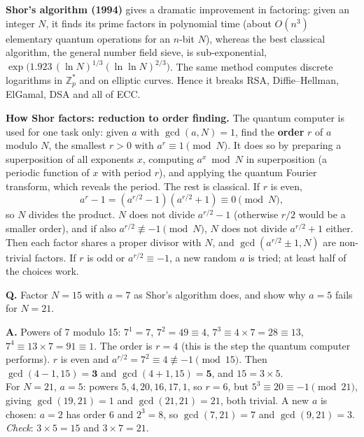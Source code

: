 \textbf{Shor's algorithm (1994)} gives a dramatic improvement in factoring: given an integer $N$, it finds its prime factors in polynomial time (about $O(n^3)$ elementary quantum operations for an $n$-bit $N$), whereas the best classical algorithm, the general number field sieve, is sub-exponential, $\exp\!\big(1.923\,(\ln N)^{1/3}(\ln\ln N)^{2/3}\big)$. The same method computes discrete logarithms in $\mathbb{Z}_p^*$ and on elliptic curves. Hence it breaks RSA, Diffie--Hellman, ElGamal, DSA and all of ECC.

\textbf{How Shor factors: reduction to order finding.} The quantum computer is used for one task only: given $a$ with $\gcd(a, N) = 1$, find the \textbf{order} $r$ of $a$ modulo $N$, the smallest $r > 0$ with $a^r \equiv 1 \pmod N$. It does so by preparing a superposition of all exponents $x$, computing $a^x \bmod N$ in superposition (a periodic function of $x$ with period $r$), and applying the quantum Fourier transform, which reveals the period. The rest is classical. If $r$ is even,
\[
a^r - 1 = (a^{r/2} - 1)(a^{r/2} + 1) \equiv 0 \pmod N ,
\]
so $N$ divides the product. $N$ does not divide $a^{r/2} - 1$ (otherwise $r/2$ would be a smaller order), and if also $a^{r/2} \not\equiv -1 \pmod N$, $N$ does not divide $a^{r/2} + 1$ either. Then each factor shares a proper divisor with $N$, and $\gcd(a^{r/2} \pm 1, N)$ are non-trivial factors. If $r$ is odd or $a^{r/2} \equiv -1$, a new random $a$ is tried; at least half of the choices work.

\begin{worked}
\textbf{Q.} Factor $N = 15$ with $a = 7$ as Shor's algorithm does, and show why $a = 5$ fails for $N = 21$.

\textbf{A.} Powers of 7 modulo 15: $7^1 = 7$, $7^2 = 49 \equiv 4$, $7^3 \equiv 4 \times 7 = 28 \equiv 13$, $7^4 \equiv 13 \times 7 = 91 \equiv 1$. The order is $r = 4$ (this is the step the quantum computer performs). $r$ is even and $a^{r/2} = 7^2 \equiv 4 \not\equiv -1 \pmod{15}$. Then $\gcd(4 - 1, 15) = \mathbf{3}$ and $\gcd(4 + 1, 15) = \mathbf{5}$, and $15 = 3 \times 5$.\\
For $N = 21$, $a = 5$: powers $5, 4, 20, 16, 17, 1$, so $r = 6$, but $5^3 \equiv 20 \equiv -1 \pmod{21}$, giving $\gcd(19, 21) = 1$ and $\gcd(21, 21) = 21$, both trivial. A new $a$ is chosen: $a = 2$ has order 6 and $2^3 = 8$, so $\gcd(7, 21) = 7$ and $\gcd(9, 21) = 3$.\\
\emph{Check}: $3 \times 5 = 15$ and $3 \times 7 = 21$.
\end{worked}

